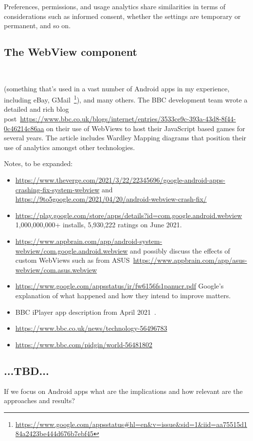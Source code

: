 Preferences, permissions, and usage analytics share similarities in terms of considerations such as informed consent, whether the settings are temporary or permanent, and so on.

\subsection{The WebView component}~\label{section-webview-component}

(something that's used in a vast number of Android apps in my experience, including eBay, GMail~\footnote{\url{https://www.google.com/appsstatus\#hl=en&v=issue&sid=1&iid=aa75515d184a2423be444d676b7ebf45}}), and many others. The BBC development team wrote a detailed and rich blog post~\url{https://www.bbc.co.uk/blogs/internet/entries/3533ce9c-393a-43d8-8f44-0c46214c86aa} on their use of WebViews to host their JavaScript based games for several years. The article includes Wardley Mapping diagrams that position their use of analytics amongst other technologies.

Notes, to be expanded:
\begin{itemize}
    \item \url{https://www.theverge.com/2021/3/22/22345696/google-android-apps-crashing-fix-system-webview} and \url{https://9to5google.com/2021/04/20/android-webview-crash-fix/}
    \item \url{https://play.google.com/store/apps/details?id=com.google.android.webview} 1,000,000,000+ installs, 5,930,222 ratings on  June 2021.
    \item \url{https://www.appbrain.com/app/android-system-webview/com.google.android.webview} and possibly discuss the effects of custom WebViews such as from ASUS~\url{https://www.appbrain.com/app/asus-webview/com.asus.webview}
    \item \url{https://www.google.com/appsstatus/ir/fw6156fs1panucr.pdf} Google's explanation of what happened and how they intend to improve matters.
    \item BBC iPlayer app description from  April 2021~\citep{bbc_iplayer_app_april_2021_webview_information}.
    \item \url{https://www.bbc.co.uk/news/technology-56496783}
    \item \url{https://www.bbc.com/pidgin/world-56481802}
\end{itemize}



\subsection{...TBD...}
If we focus on Android apps what are the implications and how relevant are the approaches and results?

